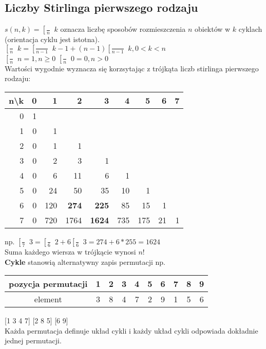 \documentclass[a4paper,12pt]{article}
\DeclareRobustCommand{\stirling}{\genfrac [ ] {0pt}{}} %
\begin{document}
\subsection{Liczby Stirlinga pierwszego rodzaju}
$s(n,k)=\stirling{n}{k}$ oznacza liczbę sposobów rozmieszczenia $n$ obiektów w $k$ cyklach (orientacja cyklu jest istotna). \\
$\stirling{n}{k}=\stirling{n-1}{k-1}+(n-1)\stirling{n-1}{k}, 0<k<n$ \\
$\stirling{n}{n}=1, n\geq0$ $\stirling{n}{0}=0, n>0$ \\
Wartości wygodnie wyznacza się korzsytając z trójkąta liczb stirlinga pierwszego rodzaju:\\
\begin{tabular}{|r|r|r|r|r|r|r|r|r|} 
 \hline
 n\textbackslash k & 0 & 1 & 2 & 3 & 4 & 5 & 6 & 7\\ \hline
 0&1&&&&&&& \\ \hline
 1&0&1&&&&&&\\ \hline
 2&0&1&1&&&&&\\ \hline
 3&0&2&3&1&&&&\\ \hline
 4&0&6&11&6&1&&&\\ \hline
 5&0&24&50&35&10&1&&\\ \hline
 6&0&120&\textbf{274}&\textbf{225}&85&15&1&\\ \hline
 7&0&720&1764&\textbf{1624}&735&175&21&1\\ \hline
\end{tabular}
np. $\stirling{7}{3}=\stirling{6}{2}+6\stirling{6}{3}=274+6*255=1624$ \\
Suma każdego wiersza w trójkącie wynosi $n!$ \\
\textbf{Cykle} stanowią alternatywny zapis permutacji np.\\
\begin{tabular}{c|c|c|c|c|c|c|c|c|c}
 pozycja permutacji &1 & 2& 3& 4&5&6&7&8&9\\ \hline
 element & 3 & 8 &4 &7 &2 &9 &1 & 5 &6 \\
\end{tabular}
[1 3 4 7] [2 8 5] [6 9] \\
Każda permutacja definuje układ cykli i każdy układ cykli odpowiada dokładnie jednej permutacji.
\end{document}
